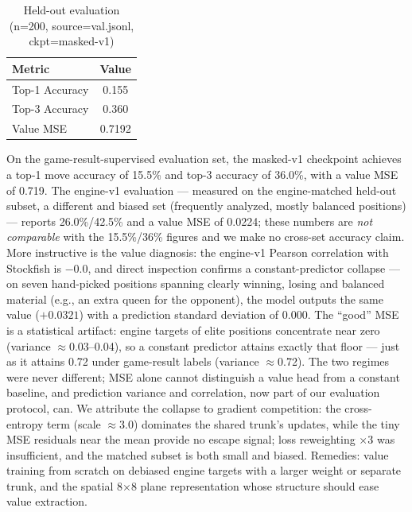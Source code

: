 \documentclass[conference,onecolumn]{IEEEtran}
\begin{document}
\begin{table}[h]\centering\caption{Held-out evaluation (n=200, source=val.jsonl, ckpt=masked-v1)}\begin{tabular}{lc}\hline Metric & Value \\ \hline Top-1 Accuracy & 0.155 \\ Top-3 Accuracy & 0.360 \\ Value MSE & 0.7192 \\ \hline\end{tabular}\end{table}
On the game-result-supervised evaluation set, the masked-v1 checkpoint achieves a top-1 move accuracy of 15.5\% and top-3 accuracy of 36.0\%, with a value MSE of 0.719. The engine-v1 evaluation --- measured on the engine-matched held-out subset, a different and biased set (frequently analyzed, mostly balanced positions) --- reports 26.0\%/42.5\% and a value MSE of 0.0224; these numbers are \emph{not comparable} with the 15.5\%/36\% figures and we make no cross-set accuracy claim. More instructive is the value diagnosis: the engine-v1 Pearson correlation with Stockfish is $-0.0$, and direct inspection confirms a constant-predictor collapse --- on seven hand-picked positions spanning clearly winning, losing and balanced material (e.g., an extra queen for the opponent), the model outputs the same value ($+0.0321$) with a prediction standard deviation of $0.000$. The ``good'' MSE is a statistical artifact: engine targets of elite positions concentrate near zero (variance $\approx$0.03--0.04), so a constant predictor attains exactly that floor --- just as it attains 0.72 under game-result labels (variance $\approx$0.72). The two regimes were never different; MSE alone cannot distinguish a value head from a constant baseline, and prediction variance and correlation, now part of our evaluation protocol, can. We attribute the collapse to gradient competition: the cross-entropy term (scale $\approx$3.0) dominates the shared trunk's updates, while the tiny MSE residuals near the mean provide no escape signal; loss reweighting $\times$3 was insufficient, and the matched subset is both small and biased. Remedies: value training from scratch on debiased engine targets with a larger weight or separate trunk, and the spatial 8$\times$8 plane representation whose structure should ease value extraction.
\end{document}
